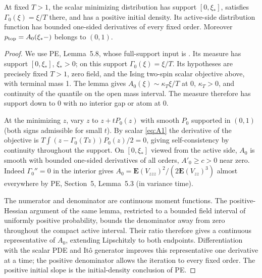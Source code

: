 \begin{lemma}
\label{paths:base-profile}
At fixed \(T>1\), the scalar minimizing distribution has support \([0,\xi_*]\), satisfies \(\Gamma_0(\xi)=\xi/T\) there, and has a positive initial density. Its active-side distribution function has bounded one-sided derivatives of every fixed order. Moreover \(p_{\rm top}=A_0(\xi_*-)\) belongs to \((0,1)\).
\end{lemma}

\begin{proof}
We use PE, Lemma~5.8, whose full-support input is \cite[Theorem~1.1 and Lemma~2.2]{Lopatto2026}. Its measure has support \([0,\xi_*]\), \(\xi_*>0\); on this support \(\Gamma_0(\xi)=\xi/T\). Its hypotheses are precisely fixed \(T>1\), zero field, and the Ising
two-spin scalar objective above, with terminal mass 1. The lemma gives \(A_0(\xi)\sim \kappa_T\xi/T\) at 0, \(\kappa_T>0\), and continuity of the quantile on the open mass interval. The measure therefore has support down to 0 with no interior gap or atom at 0.

At the minimizing \(z\), vary \(z\) to \(z+tP_0(z)\) with smooth \(P_0\) supported in \((0,1)\) (both signs admissible for small \(t\)). By scalar \eqref{eq:A1} the derivative of the objective is \(T\int (z-\Gamma_0(Tz))P_0(z)/2=0\), giving self-consistency by continuity throughout the support. On \([0,\xi_*]\) viewed from the active side, \(A_0\) is smooth with bounded one-sided derivatives of all orders, \(A'_0\ge c>0\) near zero. Indeed \(\Gamma_0''=0\) in the interior gives
\(A_0=\mathbf E (V_{zzz})^2/(2\mathbf E(V_{zz})^3)\) almost everywhere by PE, Section~5, Lemma~5.3 (in variance time).

The numerator and denominator are continuous moment functions. The
positive-Hessian argument of the same lemma, restricted to a bounded
field interval of uniformly positive probability, bounds the denominator
away from zero throughout the compact active interval. Their ratio therefore
gives a continuous representative of \(A_0\), extending Lipschitzly
to both endpoints. Differentiation with the scalar PDE and It\^o
generator improves this representative one derivative at a time;
the positive denominator allows the iteration to every fixed order.
The positive initial slope is the initial-density conclusion of PE.


\end{proof}
